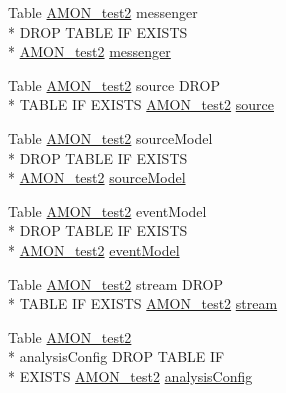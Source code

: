 \begin{DoxyCompactItemize}
\item 
Table \hyperlink{db__mc__build_8sql_a19c21c59303d8b6591b92240ff7de1d5}{A\-M\-O\-N\-\_\-test2} messenger \\*
D\-R\-O\-P T\-A\-B\-L\-E I\-F E\-X\-I\-S\-T\-S \\*
\hyperlink{db__mc__build_8sql_a19c21c59303d8b6591b92240ff7de1d5}{A\-M\-O\-N\-\_\-test2} \hyperlink{db__mc__build_8sql_acb316bd3c76edcc7d70ffc6d3b6b9ba6}{messenger}
\item 
Table \hyperlink{db__mc__build_8sql_a19c21c59303d8b6591b92240ff7de1d5}{A\-M\-O\-N\-\_\-test2} source D\-R\-O\-P \\*
T\-A\-B\-L\-E I\-F E\-X\-I\-S\-T\-S \hyperlink{db__mc__build_8sql_a19c21c59303d8b6591b92240ff7de1d5}{A\-M\-O\-N\-\_\-test2} \hyperlink{db__mc__build_8sql_a1cdff1a87485f24f4a68e1c6d818073a}{source}
\item 
Table \hyperlink{db__mc__build_8sql_a19c21c59303d8b6591b92240ff7de1d5}{A\-M\-O\-N\-\_\-test2} source\-Model \\*
D\-R\-O\-P T\-A\-B\-L\-E I\-F E\-X\-I\-S\-T\-S \\*
\hyperlink{db__mc__build_8sql_a19c21c59303d8b6591b92240ff7de1d5}{A\-M\-O\-N\-\_\-test2} \hyperlink{db__mc__build_8sql_a3f991a19d9b7954f6e45a0ee120ae12e}{source\-Model}
\item 
Table \hyperlink{db__mc__build_8sql_a19c21c59303d8b6591b92240ff7de1d5}{A\-M\-O\-N\-\_\-test2} event\-Model \\*
D\-R\-O\-P T\-A\-B\-L\-E I\-F E\-X\-I\-S\-T\-S \\*
\hyperlink{db__mc__build_8sql_a19c21c59303d8b6591b92240ff7de1d5}{A\-M\-O\-N\-\_\-test2} \hyperlink{db__mc__build_8sql_a032bb0b30507dcbea95be4589098a90a}{event\-Model}
\item 
Table \hyperlink{db__mc__build_8sql_a19c21c59303d8b6591b92240ff7de1d5}{A\-M\-O\-N\-\_\-test2} stream D\-R\-O\-P \\*
T\-A\-B\-L\-E I\-F E\-X\-I\-S\-T\-S \hyperlink{db__mc__build_8sql_a19c21c59303d8b6591b92240ff7de1d5}{A\-M\-O\-N\-\_\-test2} \hyperlink{db__mc__build_8sql_a4982435d1ddbb5e156786ba88ae7c71e}{stream}
\item 
Table \hyperlink{db__mc__build_8sql_a19c21c59303d8b6591b92240ff7de1d5}{A\-M\-O\-N\-\_\-test2} \\*
analysis\-Config D\-R\-O\-P T\-A\-B\-L\-E I\-F \\*
E\-X\-I\-S\-T\-S \hyperlink{db__mc__build_8sql_a19c21c59303d8b6591b92240ff7de1d5}{A\-M\-O\-N\-\_\-test2} \hyperlink{db__mc__build_8sql_ae935767c851325d9d634e03377c6239c}{analysis\-Config}

\end{DoxyCompactItemize}
